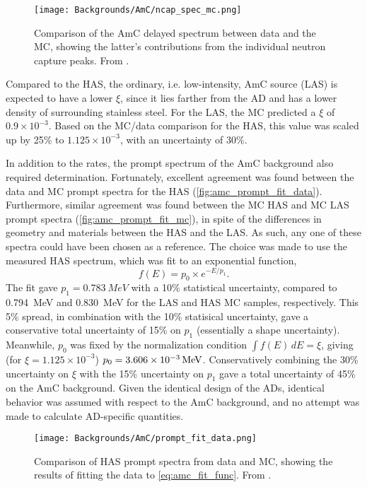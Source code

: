 \documentclass[../thesis.tex]{subfiles}
\begin{document}
\begin{figure}[ht]
  \texttt{[image: Backgrounds/AmC/ncap\_spec\_mc.png]}
  \caption{Comparison of the AmC delayed spectrum between data and the MC, showing the latter's contributions from the individual neutron capture peaks. From \cite{Gu_2016}.}
  \label{fig:amc_ncap_spec_mc}
\end{figure}

Compared to the HAS, the ordinary, i.e. low-intensity, AmC source (LAS) is expected to have a lower $\xi$, since it lies farther from the AD and has a lower density of surrounding stainless steel. For the LAS, the MC predicted a $\xi$ of $0.9\times10^{-3}$. Based on the MC/data comparison for the HAS, this value was scaled up by 25\% to $1.125\times10^{-3}$, with an uncertainty of 30\%. 

In addition to the rates, the prompt spectrum of the AmC background also required determination. Fortunately, excellent agreement was found between the data and MC prompt spectra for the HAS (\autoref{fig:amc_prompt_fit_data}). Furthermore, similar agreement was found between the MC HAS and MC LAS prompt spectra (\autoref{fig:amc_prompt_fit_mc}), in spite of the differences in geometry and materials between the HAS and the LAS. As such, any one of these spectra could have been chosen as a reference. The choice was made to use the measured HAS spectrum, which was fit to an exponential function,
\begin{equation}
  f(E) = p_0 \times e^{-E/p_1}.
  \label{eq:amc_fit_func}
\end{equation}
The fit gave $p_1 = \SI{0.783}{MeV}$ with a 10\% statistical uncertainty, compared to \SI{0.794}{MeV} and \SI{0.830}{MeV} for the LAS and HAS MC samples, respectively. This 5\% spread, in combination with the 10\% statisical uncertainty, gave a conservative total uncertainty of 15\% on $p_1$ (essentially a shape uncertainty). Meanwhile, $p_0$ was fixed by the normalization condition $\int f(E)\,dE = \xi$, giving (for $\xi = 1.125\times10^{-3}$) $p_0 = \SI[parse-numbers = false]{3.606\times10^{-3}}{/MeV}$. Conservatively combining the 30\% uncertainty on $\xi$ with the 15\% uncertainty on $p_1$ gave a total uncertainty of 45\% on the AmC background. Given the identical design of the ADs, identical behavior was assumed with respect to the AmC background, and no attempt was made to calculate AD-specific quantities.

\begin{figure}[ht]
  \texttt{[image: Backgrounds/AmC/prompt\_fit\_data.png]}
  \caption{Comparison of HAS prompt spectra from data and MC, showing the results of fitting the data to \autoref{eq:amc_fit_func}. From \cite{Gu_2016}.}
  \label{fig:amc_prompt_fit_data}
\end{figure}
\end{document}
